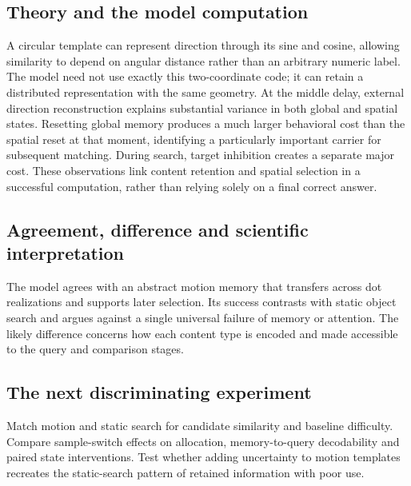 \documentclass[11pt]{article}
\begin{document}
\subsection{Theory and the model computation}
A circular template can represent direction through its sine and cosine, allowing similarity to depend on angular distance rather than an arbitrary numeric label. The model need not use exactly this two-coordinate code; it can retain a distributed representation with the same geometry. At the middle delay, external direction reconstruction explains substantial variance in both global and spatial states. Resetting global memory produces a much larger behavioral cost than the spatial reset at that moment, identifying a particularly important carrier for subsequent matching. During search, target inhibition creates a separate major cost. These observations link content retention and spatial selection in a successful computation, rather than relying solely on a final correct answer. \cite{bio_wolfe}

\subsection{Agreement, difference and scientific interpretation}
The model agrees with an abstract motion memory that transfers across dot realizations and supports later selection. Its success contrasts with static object search and argues against a single universal failure of memory or attention. The likely difference concerns how each content type is encoded and made accessible to the query and comparison stages.

\subsection{The next discriminating experiment}
Match motion and static search for candidate similarity and baseline difficulty. Compare sample-switch effects on allocation, memory-to-query decodability and paired state interventions. Test whether adding uncertainty to motion templates recreates the static-search pattern of retained information with poor use.
\end{document}
